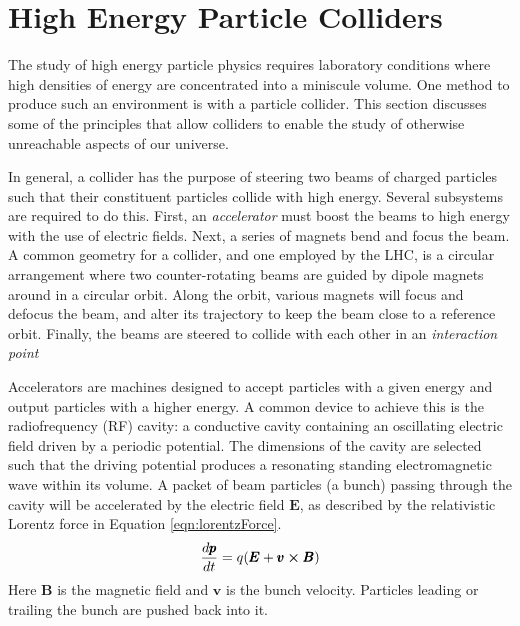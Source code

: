 \section{High Energy Particle Colliders}

The study of high energy particle physics requires laboratory conditions where high densities of energy are concentrated into a miniscule volume.
One method to produce such an environment is with a particle collider.
This section discusses some of the principles that allow colliders to enable the study of otherwise unreachable aspects of our universe.

In general, a collider has the purpose of steering two beams of charged particles such that their constituent particles collide with high energy.
Several subsystems are required to do this.
First, an \emph{accelerator} must boost the beams to high energy with the use of electric fields.
Next, a series of magnets bend and focus the beam. 
A common geometry for a collider, and one employed by the LHC, is a circular arrangement where two counter-rotating beams are guided by dipole magnets around in a circular orbit.
Along the orbit, various magnets will focus and defocus the beam, and alter its trajectory to keep the beam close to a reference orbit.
Finally, the beams are steered to collide with each other in an \emph{interaction point}

Accelerators are machines designed to accept particles with a given energy and output particles with a higher energy.
A common device to achieve this is the radiofrequency (RF) cavity: a conductive cavity containing an oscillating electric field driven by a periodic potential.
The dimensions of the cavity are selected such that the driving potential produces a resonating standing electromagnetic wave within its volume.
A packet of beam particles (a bunch) passing through the cavity will be accelerated by the electric field $\pmb E$, as described by the relativistic Lorentz force in Equation \ref{eqn:lorentzForce}.
\begin{equation}\begin{split}\label{eqn:lorentzForce}
\frac{d\pmb{p}}{dt}=q(\pmb E+\pmb v\cross\pmb B)
\end{split}\end{equation} 
Here $\pmb B$ is the magnetic field and $\pmb v$ is the bunch velocity.
Particles leading or trailing the bunch are pushed back into it.

